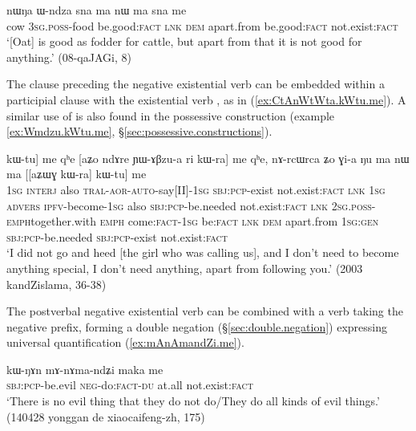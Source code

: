 \begin{exe}
\ex \label{ex:sna.me} 
\gll nɯŋa ɯ-ndza sna ma nɯ ma sna me \\
cow \textsc{3sg}.\textsc{poss}-food be.good:\textsc{fact} \textsc{lnk} \textsc{dem} apart.from be.good:\textsc{fact} not.exist:\textsc{fact} \\
\glt `[Oat] is good as fodder for cattle, but apart from that it is not good for anything.' (08-qaJAGi, 8)
\end{exe}

The clause preceding the negative existential verb can be embedded within a participial clause with the existential verb , as in (\ref{ex:CtAnWtWta.kWtu.me}). A similar use of  is also found in the possessive construction (example \ref{ex:Wmdzu.kWtu.me}, §\ref{sec:possessive.constructions}).

\begin{exe}
\ex \label{ex:CtAnWtWta.kWtu.me} 
\gll [[aʑo joβ tɕi ɕ-tɤ-nɯ-tɯt-a] kɯ-tu] me qʰe  [aʑo ndɤre ɲɯ-ɤβzu-a ri kɯ-ra] me qʰe, nɤ-rcɯ\redp{}rca ʑo ɣi-a ŋu ma nɯ ma [[aʑɯɣ kɯ-ra] kɯ-tu] me \\
\textsc{1sg} \textsc{interj} also \textsc{tral}-\textsc{aor}-\textsc{auto}-say[II]-\textsc{1sg} \textsc{sbj}:\textsc{pcp}-exist not.exist:\textsc{fact} \textsc{lnk} \textsc{1sg} \textsc{advers} \textsc{ipfv}-become-\textsc{1sg} also \textsc{sbj}:\textsc{pcp}-be.needed not.exist:\textsc{fact} \textsc{lnk} \textsc{2sg}.\textsc{poss}-\textsc{emph}\redp{}together.with \textsc{emph} come:\textsc{fact}-\textsc{1sg} be:\textsc{fact} \textsc{lnk} \textsc{dem} apart.from \textsc{1sg}:\textsc{gen} \textsc{sbj}:\textsc{pcp}-be.needed \textsc{sbj}:\textsc{pcp}-exist not.exist:\textsc{fact} \\
\glt `I did not go and heed [the girl who was calling us], and I don't need to become anything special, I don't need anything, apart from following you.' (2003 kandZislama, 36-38)
\end{exe}

The postverbal negative existential verb can be combined with a verb taking the negative prefix, forming a double negation (§\ref{sec:double.negation}) expressing universal quantification (\ref{ex:mAnAmandZi.me}).

\begin{exe}
\ex \label{ex:mAnAmandZi.me}
\gll kɯ-ŋɤn mɤ-nɤma-ndʑi maka me\\
\textsc{sbj}:\textsc{pcp}-be.evil \textsc{neg}-do:\textsc{fact}-\textsc{du} at.all not.exist:\textsc{fact}   \\
\glt `There is no evil thing that they do not do/They do all kinds of evil things.' (140428 yonggan de xiaocaifeng-zh, 175)
 \end{exe}

